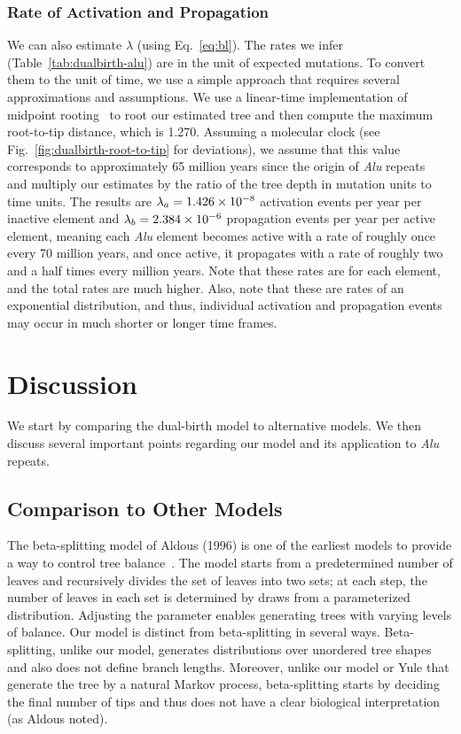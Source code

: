\subsubsection{Rate of Activation and Propagation}
We can also estimate $\lambda$ (using Eq.~\ref{eq:bl}). The rates we infer (Table~\ref{tab:dualbirth-alu}) are in the unit of expected mutations. To convert them to the unit of time, we use a simple approach that requires several approximations and assumptions. We use a linear-time implementation of midpoint rooting~\cite{Mai2017} to root our estimated tree and then compute the maximum root-to-tip distance, which is 1.270. Assuming a molecular clock (see Fig.~\ref{fig:dualbirth-root-to-tip} for deviations), we assume that this value corresponds to approximately 65 million years since the origin of \textit{Alu} repeats~\cite{Batzer2002} and multiply our estimates by the ratio of the tree depth in mutation units to time units. The results are $\lambda_a=1.426\times10^{-8}$ activation events per year per inactive element and $\lambda_b=2.384\times10^{-6}$ propagation events per year per active element, meaning each \textit{Alu} element becomes active with a rate of roughly once every 70 million years, and once active, it propagates with a rate of roughly two and a half times every million years. Note that these rates are for each element, and the total rates are much higher. Also, note that these are rates of an exponential distribution, and thus, individual activation and propagation events may occur in much shorter or longer time frames.

\section{Discussion}
We start by comparing the dual-birth model to alternative models. We then discuss several important points regarding our model and its application to \textit{Alu} repeats. 

\subsection{Comparison to Other Models}
The beta-splitting model of Aldous (1996) is one of the earliest models to provide a way to control tree balance~\cite{Aldous1996}. The model starts from a predetermined number of leaves and recursively divides the set of leaves into two sets; at each step, the number of leaves in each set is determined by draws from a parameterized distribution. Adjusting the parameter enables generating trees with varying levels of balance. Our model is distinct from beta-splitting in several ways. Beta-splitting, unlike our model, generates distributions over unordered tree shapes and also does not define branch lengths. Moreover, unlike our model or Yule that generate the tree by a natural Markov process, beta-splitting starts by deciding the final number of tips and thus does not have a clear biological interpretation (as Aldous noted).

